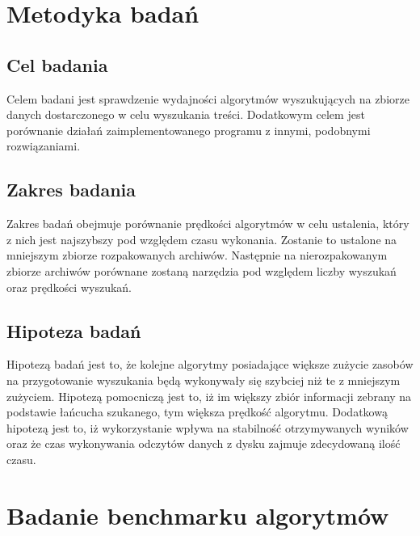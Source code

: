 \section{Metodyka badań}

\subsection{Cel badania}

Celem badani jest sprawdzenie wydajności algorytmów wyszukujących na zbiorze
danych dostarczonego w celu wyszukania treści. Dodatkowym celem jest porównanie
działań zaimplementowanego programu z innymi, podobnymi rozwiązaniami.

\subsection{Zakres badania}

Zakres badań obejmuje porównanie prędkości algorytmów w celu ustalenia, który
z nich jest najszybszy pod względem czasu wykonania. Zostanie to ustalone na
mniejszym zbiorze rozpakowanych archiwów. Następnie na nierozpakowanym zbiorze
archiwów porównane zostaną narzędzia pod względem liczby wyszukań oraz prędkości
wyszukań.

\subsection{Hipoteza badań}

Hipotezą badań jest to, że kolejne algorytmy posiadające większe zużycie zasobów
na przygotowanie wyszukania będą wykonywały się szybciej niż te z mniejszym
zużyciem. Hipotezą pomocniczą jest to, iż im większy zbiór informacji zebrany
na podstawie łańcucha szukanego, tym większa prędkość algorytmu. Dodatkową hipotezą jest
to, iż wykorzystanie  wpływa na stabilność 
otrzymywanych wyników oraz że czas wykonywania odczytów danych z dysku zajmuje
zdecydowaną ilość czasu.

\section{Badanie benchmarku algorytmów}

